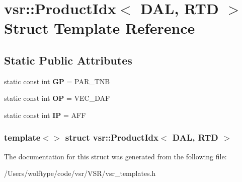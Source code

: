 \hypertarget{structvsr_1_1_product_idx_3_01_d_a_l_00_01_r_t_d_01_4}{\section{vsr\-:\-:Product\-Idx$<$ D\-A\-L, R\-T\-D $>$ Struct Template Reference}
\label{structvsr_1_1_product_idx_3_01_d_a_l_00_01_r_t_d_01_4}
}
\subsection*{Static Public Attributes}
\begin{DoxyCompactItemize}
\item 
\hypertarget{structvsr_1_1_product_idx_3_01_d_a_l_00_01_r_t_d_01_4_aae6780dd60f4f9ece6e141c1b0cc659a}{static const int {\bfseries G\-P} = P\-A\-R\-\_\-\-T\-N\-B}\label{structvsr_1_1_product_idx_3_01_d_a_l_00_01_r_t_d_01_4_aae6780dd60f4f9ece6e141c1b0cc659a}

\item 
\hypertarget{structvsr_1_1_product_idx_3_01_d_a_l_00_01_r_t_d_01_4_af9cc1edfacc43f515b1964c8c5f9cb3a}{static const int {\bfseries O\-P} = V\-E\-C\-\_\-\-D\-A\-F}\label{structvsr_1_1_product_idx_3_01_d_a_l_00_01_r_t_d_01_4_af9cc1edfacc43f515b1964c8c5f9cb3a}

\item 
\hypertarget{structvsr_1_1_product_idx_3_01_d_a_l_00_01_r_t_d_01_4_aca6b8533277c57f2ef4f79d7863b8189}{static const int {\bfseries I\-P} = A\-F\-F}\label{structvsr_1_1_product_idx_3_01_d_a_l_00_01_r_t_d_01_4_aca6b8533277c57f2ef4f79d7863b8189}

\end{DoxyCompactItemize}
\subsubsection*{template$<$$>$ struct vsr\-::\-Product\-Idx$<$ D\-A\-L, R\-T\-D $>$}



The documentation for this struct was generated from the following file\-:\begin{DoxyCompactItemize}
\item 
/\-Users/wolftype/code/vsr/\-V\-S\-R/vsr\-\_\-templates.\-h\end{DoxyCompactItemize}
